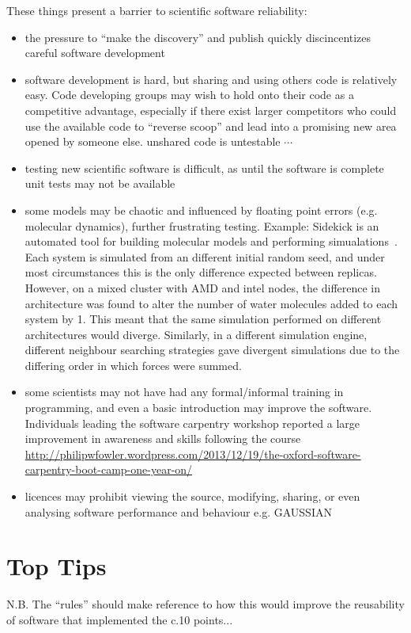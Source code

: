 \documentclass[conference]{IEEEtran}
\begin{document}
These things present a barrier to scientific software reliability:
\begin{itemize}
\item the pressure to ``make the discovery'' and publish quickly discincentizes careful software development
\item software development is hard, but sharing and using others code is relatively easy. Code developing groups may wish to hold onto their code as a competitive advantage, especially if there exist larger competitors who could use the available code to ``reverse scoop'' and lead into a promising new area opened by someone else. unshared code is untestable $\cdots$
\item testing new scientific software is difficult, as until the software is complete unit tests may not be available
\item some models may be chaotic and influenced by floating point errors (e.g. molecular dynamics), further frustrating testing. Example: Sidekick is an automated tool for building molecular models and performing simualations~\cite{Hall2014Sidekick}. Each system is simulated from an different initial random seed, and under most circumstances this is the only difference expected between replicas. However, on a mixed cluster with AMD and intel nodes, the difference in architecture was found to alter the number of water molecules added to each system by 1. This meant that the same simulation performed on different architectures would diverge. Similarly, in a different simulation engine, different neighbour searching strategies gave divergent simulations due to the differing order in which forces were summed.
\item some scientists may not have had any formal/informal training in programming, and even a basic introduction may improve the software. Individuals leading the software carpentry workshop reported a large improvement in awareness and skills following the course \url{http://philipwfowler.wordpress.com/2013/12/19/the-oxford-software-carpentry-boot-camp-one-year-on/}
\item licences may prohibit viewing the source, modifying, sharing, or even analysing software performance and behaviour e.g. GAUSSIAN~\cite{Giles2004}
\end{itemize}

\section{Top Tips}
N.B. The ``rules'' should make reference to how this would improve the reusability of software that implemented the c.10 points...
\end{document}
